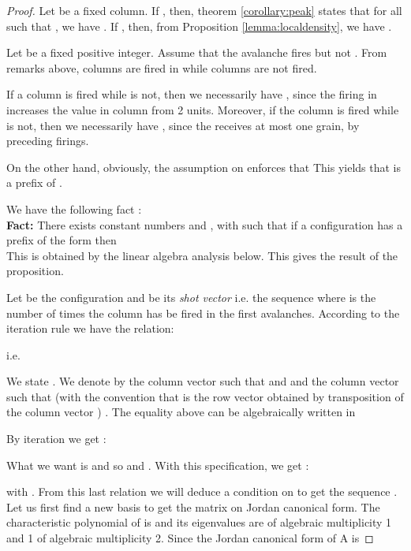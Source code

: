 \documentclass[11pt,a4paper]{llncs}
\begin{document}
\begin{proof}

Let  be a fixed column. If , then, theorem \ref{corollary:peak} states that for all  such that , we have . If , then, from Proposition \ref{lemma:localdensity},  we have .

 Let  be a fixed positive integer. Assume  that  the avalanche  fires  but not . From remarks above, columns  are fired in  while  columns  are not fired. 
 
 
If a column  is fired while  is not, then we necessarily have ,  since the firing in  increases the value in column  from 2 units. 
Moreover, if the  column  is fired while  is not, then we necessarily have , since the   receives at most one grain, by preceding firings. 

On the other hand,  obviously, the assumption on  enforces that   
This yields that  is a prefix  of . 

We have the following fact : \\ 

\textbf{Fact:} 
There exists constant numbers  and , with  such that if a  configuration   has a prefix of the form  then \\
 
 This is obtained by  the  linear algebra analysis below. This gives the result of the proposition.  


 Let  be the  configuration and  be its 
 {\em shot vector} i.e.   the sequence   where  is the number of times the column   has be fired in the  first avalanches. According to the iteration rule we have the relation:
 
 
 i.e.   

We state  . We denote  by  the column vector such that  and 
and     the column vector such that  (with the convention that   is  the row vector   obtained by transposition of the column vector ) . The equality above can be algebraically written in

 

By
iteration we get :



What we want is  and  so  and . With this specification, we get : 



 with .
From this last relation we will deduce a condition on  to get the sequence .\\


Let us first find a new basis to get the matrix  on Jordan canonical form. The characteristic polynomial of  is  and its eigenvalues are  of algebraic multiplicity 1 and 1 of algebraic multiplicity 2. Since  the Jordan canonical form of A is


\end{proof}
\end{document}
